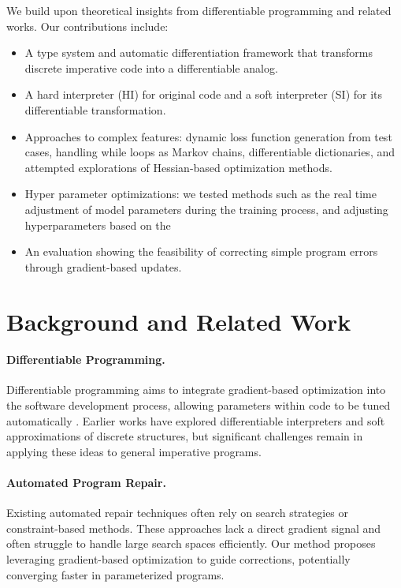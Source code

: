 \documentclass{article}
\begin{document}
We build upon theoretical insights from differentiable programming \cite{blondel2024elementsdifferentiableprogramming, DBLP:journals/corr/abs-1907-07587, vandemeulebroucke2018myia} and related works. Our contributions include:
\begin{itemize}
\item A type system and automatic differentiation framework that transforms discrete imperative code into a differentiable analog.
\item A hard interpreter (HI) for original code and a soft interpreter (SI) for its differentiable transformation.
    \item Approaches to complex features: dynamic loss function generation from test cases, handling while loops as Markov chains, differentiable dictionaries, and attempted explorations of Hessian-based optimization methods.
    \item Hyper parameter optimizations: we tested methods such as the real time adjustment of model parameters during the training process, and adjusting hyperparameters based on the 
    \item An evaluation showing the feasibility of correcting simple program errors through gradient-based updates.
\end{itemize}

\section{Background and Related Work}
\paragraph{Differentiable Programming.} Differentiable programming aims to integrate gradient-based optimization into the software development process, allowing parameters within code to be tuned automatically \cite{blondel2024elementsdifferentiableprogramming,DBLP:journals/corr/abs-1907-07587,vandemeulebroucke2018myia}. Earlier works have explored differentiable interpreters and soft approximations of discrete structures, but significant challenges remain in applying these ideas to general imperative programs.

\paragraph{Automated Program Repair.} Existing automated repair techniques often rely on search strategies or constraint-based methods. These approaches lack a direct gradient signal and often struggle to handle large search spaces efficiently. Our method proposes leveraging gradient-based optimization to guide corrections, potentially converging faster in parameterized programs.
\end{document}
